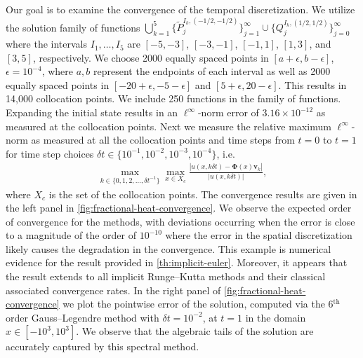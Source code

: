 \documentclass[10pt,a4paper]{article}
\newcommand{\vectt}[1]{\boldsymbol{\mathbf{#1}}}
\newcommand{\eP}{\tilde{P}}
\numberwithin{equation}{section}
\begin{document}
Our goal is to examine the convergence of the temporal discretization. We utilize the solution family of functions  $\bigcup_{k=1}^5 \{ \eP_j^{I_k,(-1/2,-1/2)} \}_{j=1}^\infty \cup \{ Q_j^{I_k,(1/2,1/2)} \}_{j=0}^\infty$ where the intervals $I_1,\dots,I_5$ are $[-5,-3]$, $[-3,-1]$, $[-1,1]$, $[1,3]$, and $[3,5]$, respectively. We choose 2000 equally spaced points in $[a+\epsilon, b-\epsilon]$, $\epsilon = 10^{-4}$, where $a, b$ represent the endpoints of each interval as well as 2000 equally spaced points in $[-20+\epsilon,-5-\epsilon]$ and $[5+\epsilon,20-\epsilon]$. This results in 14,000 collocation points. We include 250 functions in the family of functions.  Expanding the initial state results in an $\ell^\infty$-norm error of $3.16 \times 10^{-12}$ as measured at the collocation points. Next we measure the relative maximum $\ell^\infty$-norm as measured at all the collocation points and time steps from $t=0$ to $t=1$ for time step choices $\delta t \in  \{10^{-1}, 10^{-2}, 10^{-3},  10^{-4}\}$, i.e.
\begin{align}
\max_{k \in \{0, 1, 2, \dots, \delta t^{-1} \}} \max_{x \in X_c} \frac{| u(x,k \delta t) - {\bm \Phi}(x) \vectt{v}_{k} |}{|u(x,k \delta t)|},
\label{eq:time-error}
\end{align}
where $X_c$ is the set of the collocation points. The convergence results are given in the left panel in \cref{fig:fractional-heat-convergence}. We observe the expected order of convergence for the methods, with deviations occurring when the error is close to a magnitude of the order of $10^{-10}$ where the error in the spatial discretization likely causes the degradation in the convergence. This example is numerical evidence for the result provided in \cref{th:implicit-euler}. Moreover, it appears that the result extends to all implicit Runge--Kutta methods and their classical associated convergence rates. In the right panel of \cref{fig:fractional-heat-convergence} we plot the pointwise error of the solution, computed via the 6$^{\text{th}}$ order Gauss--Legendre method with $\delta t = 10^{-2}$, at $t=1$ in the domain $x \in [-10^3,10^3]$. We observe that the algebraic tails of the solution are accurately captured by this spectral method.
 
\end{document}
